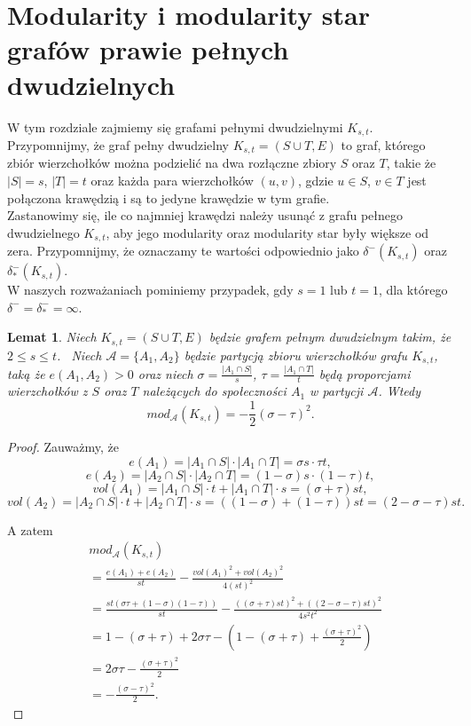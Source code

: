 \documentclass[letterpaper,12pt]{article}
\newtheorem{lemma}{Lemat}
\begin{document}
\section{Modularity i modularity star grafów prawie pełnych dwudzielnych}
W tym rozdziale zajmiemy się grafami pełnymi dwudzielnymi \(K_{s,t}\). Przypomnijmy, że graf pełny dwudzielny \(K_{s,t} = (S \cup T, E)\) to graf, którego zbiór wierzchołków można podzielić na dwa rozłączne zbiory \(S\) oraz \(T\), takie że \(|S| = s\), \(|T| = t\) oraz każda para wierzchołków \((u,v)\), gdzie \(u \in S\), \(v \in T\) jest połączona krawędzią i są to jedyne krawędzie w tym grafie.\\
Zastanowimy się, ile co najmniej krawędzi należy usunąć z grafu pełnego dwudzielnego \(K_{s,t}\), aby jego modularity oraz modularity star były większe od zera. Przypomnijmy, że oznaczamy te wartości odpowiednio jako \(\delta^{-}(K_{s,t})\) oraz \(\delta^{-}_*(K_{s,t})\).\\
W naszych rozważaniach pominiemy przypadek, gdy \(s = 1\) lub \(t = 1\), dla którego\\\(\delta^{-}=\delta^{-}_*=\infty\).
\begin{lemma}
  \label{sigma_tau}
  Niech \(K_{s,t} = (S\cup T, E)\) będzie grafem pełnym dwudzielnym takim, że \(2 \leq s \leq t\).~ Niech \(\mathcal{A} = \{A_1, A_2\}\) będzie partycją zbioru wierzchołków grafu \(K_{s,t}\), taką że \(e(A_1, A_2) > 0\) oraz niech \(\sigma = \frac{|A_1\cap S|}{s}\), \(\tau = \frac{|A_1 \cap T|}{t}\) będą proporcjami wierzchołków z \(S\) oraz \(T\) należących do społeczności \(A_1\) w partycji \(\mathcal{A}\). Wtedy
  \[mod_{\mathcal{A}}(K_{s,t}) = -\frac{1}{2}(\sigma-\tau)^2.\]
\end{lemma}

\begin{proof}
  Zauważmy, że
  \[e(A_1) = |A_1\cap S| \cdot |A_1\cap T| = \sigma s \cdot \tau t,\]
  \[e(A_2) = |A_2\cap S| \cdot |A_2\cap T| = (1-\sigma)s \cdot (1-\tau)t,\]
  \[vol(A_1) = |A_1\cap S| \cdot t + |A_1\cap T| \cdot s = (\sigma+\tau)st,\]
  \[vol(A_2) = |A_2\cap S| \cdot t + |A_2\cap T| \cdot s = ((1-\sigma)+(1-\tau))st = (2-\sigma-\tau)st.\]

  A zatem
  \begin{align*}
     & mod_{\mathcal{A}}(K_{s,t})                                                                                      \\
     & = \frac{e(A_1)+e(A_2)}{st} - \frac{vol(A_1)^2 + vol(A_2)^2}{4(st)^2}                                            \\
     & = \frac{st(\sigma \tau + (1-\sigma)(1-\tau))}{st} - \frac{((\sigma+\tau)st)^2 + ((2-\sigma-\tau)st)^2}{4s^2t^2} \\
     & = 1 - (\sigma + \tau) + 2\sigma \tau - (1-(\sigma+\tau) + \frac{(\sigma+\tau)^2}{2})                            \\
     & = 2\sigma \tau - \frac{(\sigma+\tau)^2}{2}                                                                      \\
     & = -\frac{(\sigma-\tau)^2}{2}.
  \end{align*}
\end{proof}
\end{document}
